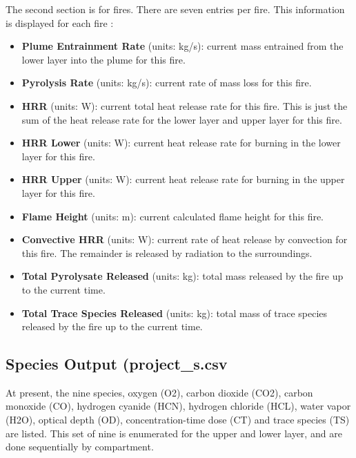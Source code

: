 The second section is for fires. There are seven entries per fire.  This information is displayed for each fire :

\begin{itemize}
\item \textbf{Plume Entrainment Rate} (units: kg/s): current mass entrained from the lower layer into the plume for this fire.
\item \textbf{Pyrolysis Rate} (units: kg/s): current rate of mass loss for this fire.
\item \textbf{HRR} (units: W): current total heat release rate for this fire. This is just the sum of the heat release rate for the lower layer and upper layer for this fire.
\item \textbf{HRR Lower} (units: W): current heat release rate for burning in the lower layer for this fire.
\item \textbf{HRR Upper} (units: W):  current heat release rate for burning in the upper layer for this fire.
\item \textbf{Flame Height} (units: m): current calculated flame height for this fire.
\item \textbf{Convective HRR} (units: W): current rate of heat release by convection for this fire.  The remainder is released by radiation to the surroundings.
\item \textbf{Total Pyrolysate Released} (units: kg): total mass released by the fire up to the current time.
\item \textbf{Total Trace Species Released} (units: kg): total mass of trace species released by the fire up to the current time.
\end{itemize}

\subsection{Species Output (project\_s.csv}

At present, the nine species, oxygen (O2), carbon dioxide (CO2), carbon monoxide (CO),  hydrogen cyanide (HCN), hydrogen chloride (HCL), water vapor (H2O), optical depth (OD), concentration-time dose (CT) and trace species (TS) are listed. This set of nine is enumerated for the upper and lower layer, and are done sequentially by compartment.

